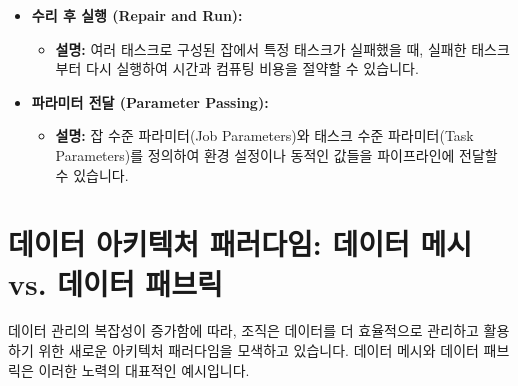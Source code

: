 \documentclass[11pt,a4paper]{article}
\begin{document}
\begin{tcolorbox}[title=\textbf{Databricks Jobs의 주요 기능}, colback=blue!5!white, colframe=blue!75!black, sharp corners, boxrule=0.8pt]
\begin{itemize}
\begin{itemize}
    \end{itemize}
    \item \textbf{수리 후 실행 (Repair and Run):}
    \begin{itemize}
        \item \textbf{설명:} 여러 태스크로 구성된 잡에서 특정 태스크가 실패했을 때, 실패한 태스크부터 다시 실행하여 시간과 컴퓨팅 비용을 절약할 수 있습니다.
    \end{itemize}
    \item \textbf{파라미터 전달 (Parameter Passing):}
    \begin{itemize}
        \item \textbf{설명:} 잡 수준 파라미터(Job Parameters)와 태스크 수준 파라미터(Task Parameters)를 정의하여 환경 설정이나 동적인 값들을 파이프라인에 전달할 수 있습니다.
    \end{itemize}
\end{itemize}
\end{tcolorbox}

\newpage
\section*{데이터 아키텍처 패러다임: 데이터 메시 vs. 데이터 패브릭}

데이터 관리의 복잡성이 증가함에 따라, 조직은 데이터를 더 효율적으로 관리하고 활용하기 위한 새로운 아키텍처 패러다임을 모색하고 있습니다. 데이터 메시와 데이터 패브릭은 이러한 노력의 대표적인 예시입니다.
\end{document}
